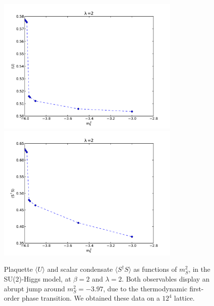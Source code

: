 \begin{figure}[thb] 
\begin{adjustwidth}{-4em}{-4em}
  \includegraphics[width=9cm,clip]{pics/SU2H_jump_plaquette}\includegraphics[width=9cm,clip]{pics/SU2H_jump_condensate}
\end{adjustwidth}
  \caption{Plaquette $\langle U \rangle$ and scalar condensate $\langle S^{\dagger}S \rangle$ as functions of $m_S^2$, in the SU(2)-Higgs model, at $\beta =2$ and $\lambda = 2$. Both observables display an abrupt jump around $m_S^2 = -3.97$, due to the thermodynamic first-order phase transition. We obtained these data on a $12^4$ lattice.}
  \label{SU2H_jump_pl_cond}
\end{figure}


